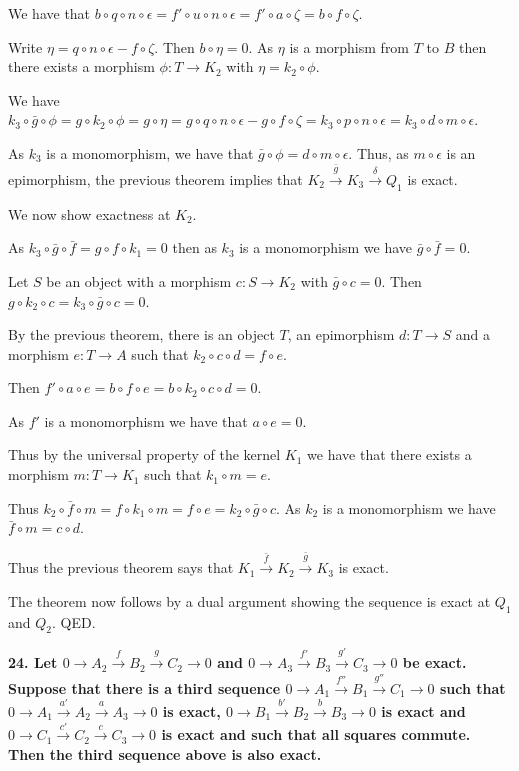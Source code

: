 \documentclass[12pt]{article}
\begin{document}
We have that $b\circ q\circ n\circ \epsilon = f'\circ u\circ n\circ \epsilon = f'\circ a\circ \zeta = b\circ f\circ \zeta$.

Write $\eta = q\circ n\circ \epsilon - f\circ \zeta$. Then $b\circ \eta = 0$. As $\eta$ is a morphism from $T$ to $B$ then there exists a morphism $\phi : T \to K_2$ with $\eta = k_2\circ \phi$.

We have $k_3\circ \bar{g}\circ \phi = g\circ k_2\circ \phi = g\circ \eta = g\circ q\circ n\circ \epsilon - g\circ f\circ \zeta = k_3\circ p\circ n\circ \epsilon = k_3\circ d\circ m\circ \epsilon$.

As $k_3$ is a monomorphism, we have that $\bar{g}\circ \phi = d\circ m\circ \epsilon$. Thus, as $m\circ \epsilon$ is an epimorphism, the previous theorem implies that $K_2 \overset{\bar{g}}{\rightarrow} K_3 \overset{\delta}{\rightarrow} Q_1$ is exact.

We now show exactness at $K_2$.

As $k_3\circ \bar{g}\circ \bar{f} = g\circ f\circ k_1 = 0$ then as $k_3$ is a monomorphism we have $\bar{g}\circ \bar{f} = 0$.

Let $S$ be an object with a morphism $c : S \to K_2$ with $\bar{g}\circ c = 0$. Then $g\circ k_2\circ c = k_3\circ \bar{g}\circ c = 0$.

By the previous theorem, there is an object $T$, an epimorphism $d : T \to S$ and a morphism $e : T \to A$ such that $k_2\circ c\circ d = f\circ e$.

Then $f'\circ a\circ e = b\circ f\circ e = b\circ k_2\circ c\circ d = 0$.

As $f'$ is a monomorphism we have that $a\circ e = 0$.

Thus by the universal property of the kernel $K_1$ we have that there exists a morphism $m : T \to K_1$ such that $k_1\circ m = e$.

Thus $k_2\circ \bar{f}\circ m = f\circ k_1\circ m = f\circ e = k_2\circ \bar{g}\circ c$. As $k_2$ is a monomorphism we have $\bar{f}\circ m = c\circ d$.

Thus the previous theorem says that $K_1 \overset{\bar{f}}{\rightarrow} K_2 \overset{\bar{g}}{\rightarrow} K_3$ is exact.

The theorem now follows by a dual argument showing the sequence is exact at $Q_1$ and $Q_2$. QED.

\textbf{24. Let $0 \rightarrow A_2 \overset{f}{\rightarrow} B_2 \overset{g}{\rightarrow} C_2 \rightarrow 0$ and $0 \rightarrow A_3 \overset{f'}{\rightarrow} B_3 \overset{g'}{\rightarrow} C_3 \rightarrow 0$ be exact. Suppose that there is a third sequence $0 \rightarrow A_1 \overset{f''}{\rightarrow} B_1 \overset{g''}{\rightarrow} C_1 \rightarrow 0$ such that $0 \rightarrow A_1 \overset{a'}{\rightarrow} A_2 \overset{a}{\rightarrow} A_3 \rightarrow 0$ is exact, $0 \rightarrow B_1 \overset{b'}{\rightarrow} B_2 \overset{b}{\rightarrow} B_3 \rightarrow 0$ is exact and $0 \rightarrow C_1 \overset{c'}{\rightarrow} C_2 \overset{c}{\rightarrow} C_3 \rightarrow 0$ is exact and such that all squares commute. Then the third sequence above is also exact.}
\end{document}
